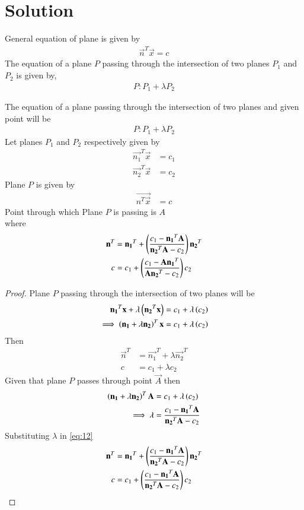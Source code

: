 \documentclass[journal,12pt,twocolumn]{IEEEtran}
\begin{document}
\section{Solution}
General equation of plane is given by
\begin{align}
    \vec{n}^T\vec{x} = c
\end{align}
The equation of a plane $P$ passing through the intersection of two planes $P_{1}$ and $P_{2}$ is given by,
\begin{align}
   P : P_{1} + \lambda P_{2}\label{eq1}
\end{align}
\begin{lemma}
The equation of a plane passing through the intersection of two planes and given point will be\\
\begin{align}
P : P_{1} + \lambda P_{2}\label{eq1}
\end{align}
Let planes $P_{1}$ and $P_{2}$ respectively given by
\begin{align}
\vec{n_{1}}^T\vec{x}&=c_{1}\\ \vec{n_{2}}^T\vec{x}&=c_{2}
\end{align}
Plane $P$  is given by 
\begin{align}
\vec{n^T\vec{x}}&=c
\end{align}
Point through which Plane $P$ is passing is $A$\\
where
\begin{align}
\mathbf{n}^T &= \mathbf{n_{1}}^T + \left(\frac{c_{1} - \mathbf{n_{1}}^T\mathbf{A}}{\mathbf{n_{2}}^T\mathbf{A}- c_{2}}\right)\mathbf{n_{2}}^T\\
c &= c_{1} + \left(\frac{c_{1} - \mathbf{A}\mathbf{n_{1}}^T}{\mathbf{A}\mathbf{n_{2}}^T- c_{2}}\right)c_{2}
\end{align}
\end{lemma}
\begin{proof}
Plane $P$ passing through the intersection of two planes will be
\begin{align}
\mathbf{n_{1}}^T\mathbf{x} + \lambda\left(\mathbf{n_{2}}^T\mathbf{x}\right) = c_{1} + \lambda\left(c_{2}\right)\\
\implies \left(\mathbf{n_{1}}+\lambda\mathbf{n_{2}}\right)^T\mathbf{x} = c_{1} + \lambda\left(c_{2}\right)
\end{align}
Then
\begin{align}\label{eq:12}
\vec{n}^T &= \vec{n_{1}}^T + \lambda\vec{n_{2}}^T\\
c &= c_{1} + \lambda c_{2}
\end{align}
Given that plane $P$ passes through point $\vec{A}$ then
\begin{align}
\left(\mathbf{n_{1}}+\lambda\mathbf{n_{2}}\right)^T\mathbf{A} &= c_{1} + \lambda\left(c_{2}\right)\\
\implies \lambda &= \frac{c_{1} - \mathbf{n_{1}}^T\mathbf{A}}{\mathbf{n_{2}}^T\mathbf{A}- c_{2}}
\end{align}
Substituting $\lambda$ in \eqref{eq:12}
\begin{align}
\mathbf{n}^T &= \mathbf{n_{1}}^T + \left(\frac{c_{1} - \mathbf{n_{1}}^T\mathbf{A}}{\mathbf{n_{2}}^T\mathbf{A}- c_{2}}\right)\mathbf{n_{2}}^T\\
c &= c_{1} + \left(\frac{c_{1} - \mathbf{n_{1}}^T\mathbf{A}}{\mathbf{n_{2}}^T\mathbf{A}- c_{2}}\right)c_{2}
\end{align}
\end{proof}
\end{document}
